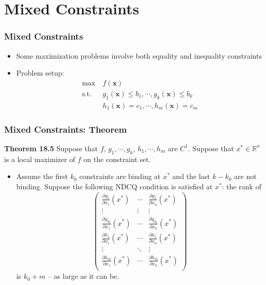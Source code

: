 \documentclass[9pt,aspectratio=169]{beamer}
\begin{document}
\section{Mixed Constraints}

\begin{frame}
\frametitle{Mixed Constraints}
\begin{itemize}
	\item Some maximization problems involve both equality and inequality constraints
	\item Problem setup:
		\begin{align}
		\max\  & f(\mathbf{x}) \nonumber  \\
		\text{s.t.}\ \ & g_1(\mathbf{x})\leq b_1,\cdots, g_k(\mathbf{x})\leq b_k   \nonumber \\
		& h_1(\mathbf{x}) = c_1,\cdots, h_m(\mathbf{x})= c_m \nonumber 
		\end{align}
\end{itemize}
\end{frame}

\begin{frame}
	\frametitle{Mixed Constraints: Theorem}
    \begin{block}{\textbf{Theorem 18.5}}
        Suppose that $f$, $g_1,\cdots,g_k$, $h_1,\cdots,h_m$ are $C^1$.
        Suppose that $x^*\in \mathbb{R}^n$ is a local maximizer of
        $f$ on the constraint set.
        \begin{itemize}
            \item Assume the first $k_0$ constraints are binding at
            $x^*$ and the last $k-k_0$ are not binding. Suppose the
            following NDCQ condition is satisfied at $x^*$: the rank of
            $$\left({\begin{array}{ccc} 
                      \frac{\partial g_1}{\partial x_1}(x^*) & \cdots &\frac{\partial g_1}{\partial x_n}(x^*)\\
                      \vdots & \vdots & \vdots \\	
                      \frac{\partial g_{k_0}}{\partial x_1}(x^*) & \cdots &\frac{\partial g_{k_0}}{\partial x_n}(x^*)\\
                      \frac{\partial h_1}{\partial x_1}(x^*) & \cdots &\frac{\partial h_1}{\partial x_n}(x^*)\\	
                      \vdots & \ddots & \vdots \\
                      \frac{\partial h_m}{\partial x_1}(x^*) & \cdots &\frac{\partial h_m}{\partial x_n}(x^*)\\	
                  \end{array}}\right)  $$
            is $k_0+m$ -- as large as it can be. 
        \end{itemize}    
    \end{block}
	
\end{frame}	
\end{document}
